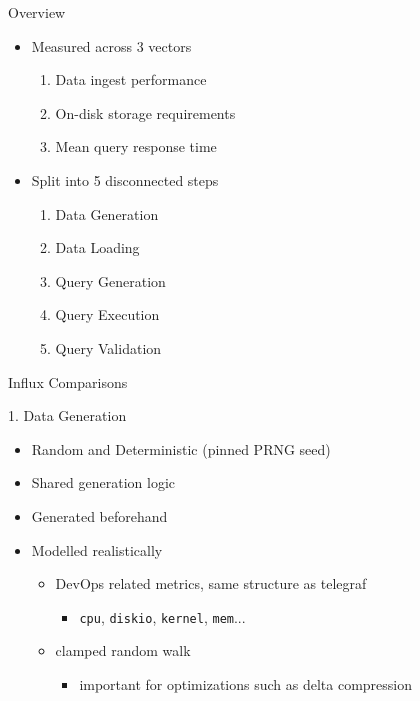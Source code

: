 \documentclass[compress,aspectratio=169]{beamer}
\begin{document}
\begin{frame}{Overview}
\begin{itemize}
  \item Measured across 3 vectors
  \begin{enumerate}
    \item Data ingest performance
    \item On-disk storage requirements
    \item Mean query response time
  \end{enumerate}
\item Split into 5 disconnected steps
  \begin{enumerate}
    \item Data Generation
    \item Data Loading
    \item Query Generation
    \item Query Execution
    \item Query Validation
  \end{enumerate}
\end{itemize}
\end{frame}

\begin{frame}{Influx Comparisons}
\begin{block}{1. Data Generation}
\begin{itemize}
  \item Random and Deterministic (pinned PRNG seed)
  \item Shared generation logic
  \item Generated beforehand
  \item Modelled realistically
  \begin{itemize}
    \item DevOps related metrics, same structure as telegraf
    \begin{itemize}
      \item \texttt{cpu}, \texttt{diskio}, \texttt{kernel}, \texttt{mem}...
    \end{itemize}
    \item clamped random walk
    \begin{itemize}
      \item important for optimizations such as delta compression
    \end{itemize}
  \end{itemize}
\end{itemize}
\end{block}
\end{frame}
\end{document}
